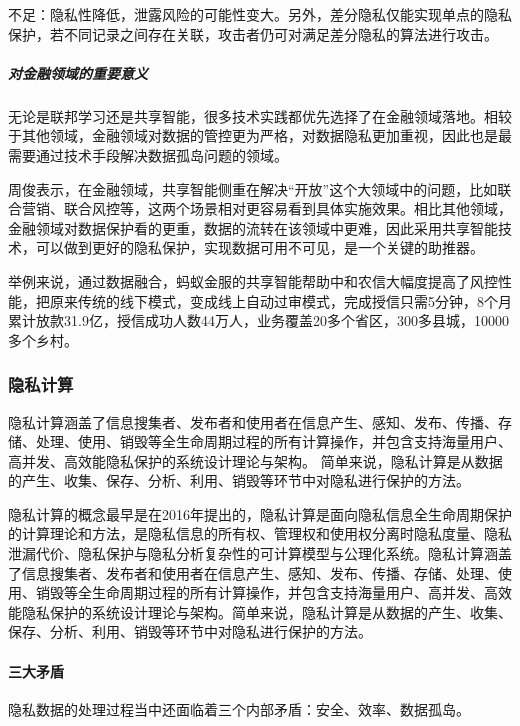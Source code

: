 \documentclass[letterpaper,10pt,english]{sphinxmanual}
\begin{document}
不足：隐私性降低，泄露风险的可能性变大。另外，差分隐私仅能实现单点的隐私保护，若不同记录之间存在关联，攻击者仍可对满足差分隐私的算法进行攻击。


\subparagraph{对金融领域的重要意义}
\label{\detokenize{chapter_data_dive/private:id5}}
无论是联邦学习还是共享智能，很多技术实践都优先选择了在金融领域落地。相较于其他领域，金融领域对数据的管控更为严格，对数据隐私更加重视，因此也是最需要通过技术手段解决数据孤岛问题的领域。

周俊表示，在金融领域，共享智能侧重在解决“开放”这个大领域中的问题，比如联合营销、联合风控等，这两个场景相对更容易看到具体实施效果。相比其他领域，金融领域对数据保护看的更重，数据的流转在该领域中更难，因此采用共享智能技术，可以做到更好的隐私保护，实现数据可用不可见，是一个关键的助推器。

举例来说，通过数据融合，蚂蚁金服的共享智能帮助中和农信大幅度提高了风控性能，把原来传统的线下模式，变成线上自动过审模式，完成授信只需5分钟，8个月累计放款31.9亿，授信成功人数44万人，业务覆盖20多个省区，300多县城，10000多个乡村。


\subsubsection{隐私计算}
\label{\detokenize{chapter_data_dive/privacy_computing:id1}}\label{\detokenize{chapter_data_dive/privacy_computing::doc}}
隐私计算涵盖了信息搜集者、发布者和使用者在信息产生、感知、发布、传播、存储、处理、使用、销毁等全生命周期过程的所有计算操作，并包含支持海量用户、高并发、高效能隐私保护的系统设计理论与架构。
简单来说，隐私计算是从数据的产生、收集、保存、分析、利用、销毁等环节中对隐私进行保护的方法。

隐私计算的概念最早是在2016年提出的，隐私计算是面向隐私信息全生命周期保护的计算理论和方法，是隐私信息的所有权、管理权和使用权分离时隐私度量、隐私泄漏代价、隐私保护与隐私分析复杂性的可计算模型与公理化系统。隐私计算涵盖了信息搜集者、发布者和使用者在信息产生、感知、发布、传播、存储、处理、使用、销毁等全生命周期过程的所有计算操作，并包含支持海量用户、高并发、高效能隐私保护的系统设计理论与架构。简单来说，隐私计算是从数据的产生、收集、保存、分析、利用、销毁等环节中对隐私进行保护的方法。%
\begin{footnote}[916]\sphinxAtStartFootnote
{}
%
\end{footnote}


\paragraph{三大矛盾}
\label{\detokenize{chapter_data_dive/privacy_computing:id2}}
隐私数据的处理过程当中还面临着三个内部矛盾：安全、效率、数据孤岛。
\end{document}
